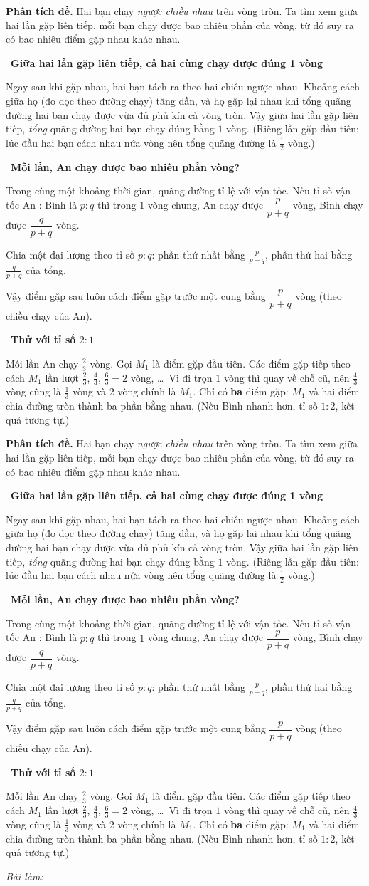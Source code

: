 \documentclass[11pt]{article}
\newif\ifsol \soltrue
\newcommand{\probsol}[1]{%
  \begin{lrbox}{\solmeasure}\begin{minipage}{\dimexpr\linewidth-24pt\relax}#1\end{minipage}\end{lrbox}%
  \ifsol
    \begin{solbox}#1\end{solbox}%
  \else
    \setlength{\solht}{\dimexpr\ht\solmeasure+\dp\solmeasure+0.85cm\relax}%
    \ifdim\solht<1.35cm\setlength{\solht}{1.35cm}\fi
    \ifdim\solht>\StudentMaxWork\setlength{\solht}{\StudentMaxWork}\fi
    \begin{tcolorbox}[colback=white,colframe=Line,boxrule=0.8pt,arc=5pt,
      left=8pt,right=8pt,top=4pt,bottom=4pt,height=\solht]{\footnotesize\color{Slate}\itshape\WorkWord}\end{tcolorbox}%
  \fi}
\newlength{\StudentMaxWork}\setlength{\StudentMaxWork}{7.5cm}
\newcommand{\step}[2]{\par\smallskip\noindent{\bfseries\color{tmBlue!85!black}\StepWord~#1.}\ {\bfseries #2}\par\nopagebreak}
\def\WorkWord{Bài làm:}
\def\StepWord{Bước}
\begin{document}
\probsol{
\textbf{Phân tích đề.} Hai bạn chạy \emph{ngược chiều nhau} trên vòng tròn. Ta tìm xem giữa hai lần gặp liên tiếp, mỗi bạn chạy được bao nhiêu phần của vòng, từ đó suy ra có bao nhiêu điểm gặp nhau khác nhau.

\step{1}{Giữa hai lần gặp liên tiếp, cả hai cùng chạy được đúng 1 vòng}
\begin{proofbox}Ngay sau khi gặp nhau, hai bạn tách ra theo hai chiều ngược nhau. Khoảng cách giữa họ (đo dọc theo đường chạy) tăng dần, và họ gặp lại nhau khi tổng quãng đường hai bạn chạy được vừa đủ phủ kín cả vòng tròn. Vậy giữa hai lần gặp liên tiếp, \emph{tổng} quãng đường hai bạn chạy đúng bằng $1$ vòng. (Riêng lần gặp đầu tiên: lúc đầu hai bạn cách nhau nửa vòng nên tổng quãng đường là $\frac12$ vòng.)\end{proofbox}

\step{2}{Mỗi lần, An chạy được bao nhiêu phần vòng?}
Trong cùng một khoảng thời gian, quãng đường tỉ lệ với vận tốc. Nếu tỉ số vận tốc An : Bình là $p:q$ thì trong $1$ vòng chung, An chạy được $\dfrac{p}{p+q}$ vòng, Bình chạy được $\dfrac{q}{p+q}$ vòng.
\begin{recallbox}Chia một đại lượng theo tỉ số $p:q$: phần thứ nhất bằng $\frac{p}{p+q}$, phần thứ hai bằng $\frac{q}{p+q}$ của tổng.\end{recallbox}
Vậy điểm gặp sau luôn cách điểm gặp trước một cung bằng $\dfrac{p}{p+q}$ vòng (theo chiều chạy của An).

\step{3}{Thử với tỉ số $2:1$}
Mỗi lần An chạy $\frac{2}{3}$ vòng. Gọi $M_1$ là điểm gặp đầu tiên. Các điểm gặp tiếp theo cách $M_1$ lần lượt $\frac23$, $\frac43$, $\frac63=2$ vòng, \dots\ Vì đi trọn $1$ vòng thì quay về chỗ cũ, nên $\frac43$ vòng cũng là $\frac13$ vòng và $2$ vòng chính là $M_1$. Chỉ có \textbf{ba} điểm gặp: $M_1$ và hai điểm chia đường tròn thành ba phần bằng nhau. (Nếu Bình nhanh hơn, tỉ số $1:2$, kết quả tương tự.)

}
\end{document}
